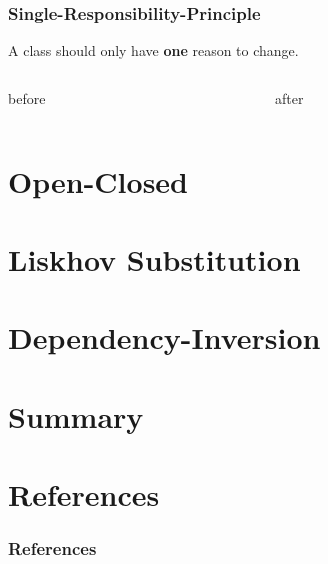 \documentclass[9pt]{beamer}
\begin{document}
\begin{frame}
  \frametitle{Single-Responsibility-Principle}
  \begin{theorem}
    A class should only have \textbf{one} reason to change.
  \end{theorem}
\vfill
  \begin{columns}[c]
    \begin{column}{.49\textwidth}
       \begin{block}{before}

          \begin{center}
          \end{center}
       \end{block}
    \end{column}
    \begin{column}{.49\textwidth}
       \begin{block}{after}
       \begin{center}
       \end{center}
      \end{block}
    \end{column}
  \end{columns}
\end{frame}

\section{Open-Closed}

\section{Liskhov Substitution}

\section{Dependency-Inversion}

\section{Summary}

\section{References}
\scriptsize
\begin{frame}
  \frametitle{References}
   
  
\end{frame}
\end{document}
